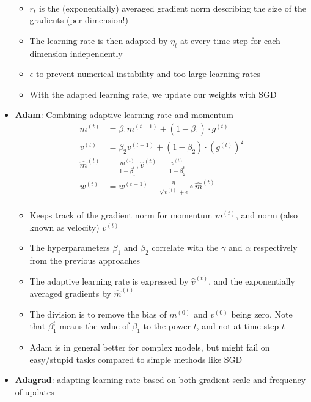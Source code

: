 \begin{itemize}
\begin{equation*}
\begin{split}
		\end{split}
	\end{equation*}
	\begin{itemize}
		\item $r_t$ is the (exponentially) averaged gradient norm describing the size of the gradients (per dimension!)
		\item The learning rate is then adapted by $\eta_t$ at every time step for each dimension independently
		\item $\epsilon$ to prevent numerical instability and too large learning rates
		\item With the adapted learning rate, we update our weights with SGD
	\end{itemize}
	\item \textbf{Adam}: Combining adaptive learning rate and momentum
	\begin{equation*}
		\begin{split}
			m^{(t)} & = \beta_1 m^{(t-1)} + (1 - \beta_1)\cdot g^{(t)}\\
			v^{(t)} & = \beta_2 v^{(t-1)} + (1 - \beta_2)\cdot \left(g^{(t)}\right)^2\\
			\hat{m}^{(t)} & = \frac{m^{(t)}}{1-\beta^{t}_1}, \hat{v}^{(t)} = \frac{v^{(t)}}{1-\beta^{t}_2}\\
			w^{(t)} & = w^{(t-1)} - \frac{\eta}{\sqrt{v^{(t)}} + \epsilon}\circ \hat{m}^{(t)}\\
		\end{split}
	\end{equation*}
	\begin{itemize}
		\item Keeps track of the gradient norm for momentum $m^{(t)}$, and norm (also known as velocity) $v^{(t)}$
		\item The hyperparameters $\beta_1$ and $\beta_2$ correlate with the $\gamma$ and $\alpha$ respectively from the previous approaches
		\item The adaptive learning rate is expressed by $\hat{v}^{(t)}$, and the exponentially averaged gradients by $\hat{m}^{(t)}$
		\item The division is to remove the bias of $m^{(0)}$ and $v^{(0)}$ being zero. Note that $\beta_1^t$ means the value of $\beta_1$ to the power $t$, and not at time step $t$
		\item Adam is in general better for complex models, but might fail on easy/stupid tasks compared to simple methods like SGD
	\end{itemize}
	\item \textbf{Adagrad}: adapting learning rate based on both gradient scale and frequency of updates

\end{itemize}
